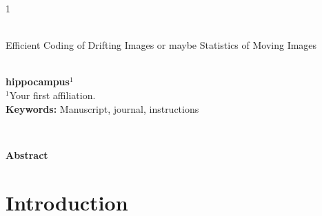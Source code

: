 \documentclass[12pt]{article}
\begin{document}
\hspace{13.9cm}1

\ \vspace{20mm}\\

{\LARGE Efficient Coding of Drifting Images or maybe Statistics of Moving Images}

\ \\
{\bf \large hippocampus$^{\displaystyle 1}$}\\
{$^{\displaystyle 1}$Your first affiliation.}\\
%

{\bf Keywords:} Manuscript, journal, instructions

\thispagestyle{empty}
%
\ \vspace{-0mm}\\
%
\begin{center} {\bf Abstract} \end{center}
\lipsum[1]

\section{Introduction}
\end{document}
